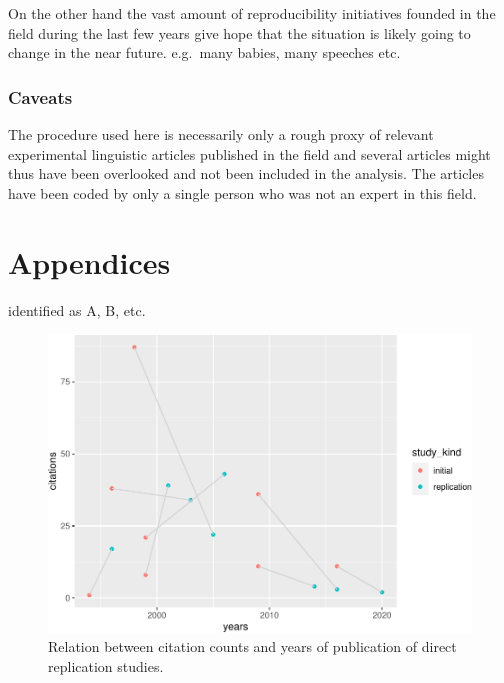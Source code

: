 \documentclass[]{elsarticle} %
\begin{document}
On the other hand the vast amount of reproducibility initiatives founded
in the field during the last few years give hope that the situation is
likely going to change in the near future. e.g.~many babies, many
speeches etc.

\hypertarget{caveats}{%
\subsubsection{Caveats}\label{caveats}}

The procedure used here is necessarily only a rough proxy of relevant
experimental linguistic articles published in the field and several
articles might thus have been overlooked and not been included in the
analysis. The articles have been coded by only a single person who was
not an expert in this field.

\hypertarget{appendices}{%
\section{Appendices}\label{appendices}}

identified as A, B, etc.

\begin{figure}

{\centering \includegraphics[width=1\linewidth]{ReplicationLing_files/figure-latex/cit-and-years-direct-1} 

}

\caption{Relation between citation counts and years of publication of direct replication studies.}\label{fig:cit-and-years-direct}
\end{figure}
\end{document}

